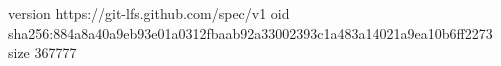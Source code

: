 version https://git-lfs.github.com/spec/v1
oid sha256:884a8a40a9eb93e01a0312fbaab92a33002393c1a483a14021a9ea10b6ff2273
size 367777
